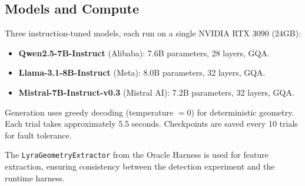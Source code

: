\subsection{Models and Compute}

Three instruction-tuned models, each run on a single NVIDIA RTX 3090
(24GB):

\begin{itemize}[nosep]
  \item \textbf{Qwen2.5-7B-Instruct} (Alibaba): 7.6B parameters,
    28 layers, GQA.
  \item \textbf{Llama-3.1-8B-Instruct} (Meta): 8.0B parameters,
    32 layers, GQA.
  \item \textbf{Mistral-7B-Instruct-v0.3} (Mistral AI): 7.2B
    parameters, 32 layers, GQA.
\end{itemize}

Generation uses greedy decoding (temperature $= 0$) for deterministic
geometry. Each trial takes approximately 5.5 seconds. Checkpoints are
saved every 10 trials for fault tolerance.

The \texttt{LyraGeometryExtractor} from the Oracle Harness is used for
feature extraction, ensuring consistency between the detection experiment
and the runtime harness.
